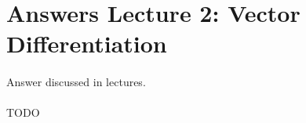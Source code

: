 \section{Answers Lecture 2: Vector Differentiation}
\paragraph{} Answer discussed in lectures.

\paragraph{} TODO